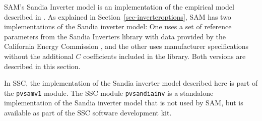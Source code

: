 \documentclass[12pt,letterpaper]{article}
\begin{document}
SAM's Sandia Inverter model is an implementation of the empirical model described in \citet{king2007}. As explained in Section~\ref{sec-inverteroptions}, SAM has two implementations of the Sandia inverter model: One uses  a set of reference parameters from the Sandia Inverters library with data provided by the California Energy Commission \citep{gsc2014a}, and the other uses manufacturer specifications without the additional $C$ coefficients included in the library. Both versions are described in this section.

In SSC, the implementation of the Sandia inverter model described here is part of the \texttt{pvsamv1} module. The SSC module \texttt{pvsandiainv} is a standalone implementation of the Sandia inverter model that is not used by SAM, but is available as part of the SSC software development kit.
\end{document}

